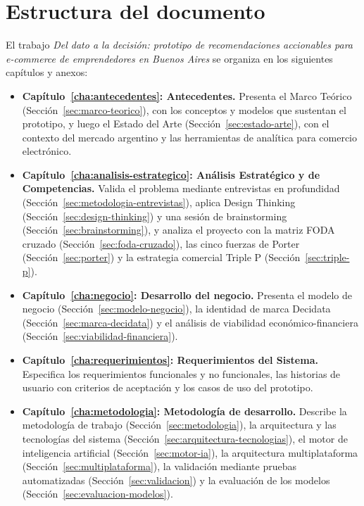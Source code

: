 \section{Estructura del documento}
\label{sec:estructura-documento}

El trabajo \emph{Del dato a la decisión: prototipo de recomendaciones accionables para e-commerce de emprendedores en Buenos Aires} se organiza en los siguientes capítulos y anexos:

\begin{itemize}
    \item \textbf{Capítulo~\ref{cha:antecedentes}: Antecedentes.} Presenta el Marco Teórico (Sección~\ref{sec:marco-teorico}), con los conceptos y modelos que sustentan el prototipo, y luego el Estado del Arte (Sección~\ref{sec:estado-arte}), con el contexto del mercado argentino y las herramientas de analítica para comercio electrónico.
    \item \textbf{Capítulo~\ref{cha:analisis-estrategico}: Análisis Estratégico y de Competencias.} Valida el problema mediante entrevistas en profundidad (Sección~\ref{sec:metodologia-entrevistas}), aplica Design Thinking (Sección~\ref{sec:design-thinking}) y una sesión de brainstorming (Sección~\ref{sec:brainstorming}), y analiza el proyecto con la matriz FODA cruzado (Sección~\ref{sec:foda-cruzado}), las cinco fuerzas de Porter (Sección~\ref{sec:porter}) y la estrategia comercial Triple P (Sección~\ref{sec:triple-p}).
    \item \textbf{Capítulo~\ref{cha:negocio}: Desarrollo del negocio.} Presenta el modelo de negocio (Sección~\ref{sec:modelo-negocio}), la identidad de marca Decidata (Sección~\ref{sec:marca-decidata}) y el análisis de viabilidad económico-financiera (Sección~\ref{sec:viabilidad-financiera}).
    \item \textbf{Capítulo~\ref{cha:requerimientos}: Requerimientos del Sistema.} Especifica los requerimientos funcionales y no funcionales, las historias de usuario con criterios de aceptación y los casos de uso del prototipo.
    \item \textbf{Capítulo~\ref{cha:metodologia}: Metodología de desarrollo.} Describe la metodología de trabajo (Sección~\ref{sec:metodologia}), la arquitectura y las tecnologías del sistema (Sección~\ref{sec:arquitectura-tecnologias}), el motor de inteligencia artificial (Sección~\ref{sec:motor-ia}), la arquitectura multiplataforma (Sección~\ref{sec:multiplataforma}), la validación mediante pruebas automatizadas (Sección~\ref{sec:validacion}) y la evaluación de los modelos (Sección~\ref{sec:evaluacion-modelos}).

\end{itemize}

